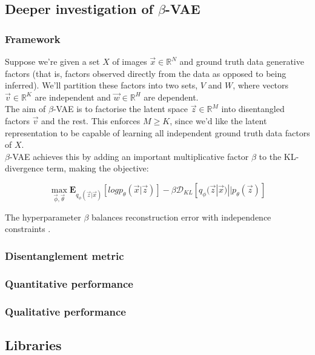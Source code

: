 \documentclass[12pt,twoside]{article}
\begin{document}
\subsection{Deeper investigation of $\beta$-VAE}
\subsubsection{Framework}

Suppose we're given a set $X$ of images $\vec{x}\in\mathbb{R}^N$ and ground truth data generative factors (that is, factors observed directly from the data as opposed to being inferred). We'll partition these factors into two sets, $V$ and $W$, where vectors $\vec{v}\in\mathbb{R}^K$ are independent and $\vec{w}\in\mathbb{R}^H$ are dependent.\\

The aim of $\beta$-VAE is to factorise the latent space $\vec{z}\in\mathbb{R}^M$ into disentangled factors $\vec{v}$ and the rest. This enforces $M\geq K$, since we'd like the latent representation to be capable of learning all independent ground truth data factors of $X$.\\

$\beta$-VAE achieves this by adding an important multiplicative factor $\beta$ to the KL-divergence term, making the objective:

\begin{equation}
\label{beta_vae_objective}
\max_{\vec{\phi},\vec{\theta}}\mathbf{E}_{q_{\phi}(\vec{z}|\vec{x})}[log p_{\theta}(\vec{x}|\vec{z})] - \beta\mathcal{D}_{KL}[q_{\phi}(\vec{z}|\vec{x})||p_{\theta}(\vec{z})]
\end{equation}

The hyperparameter $\beta$ balances reconstruction error with independence constraints \cite{Higgins2016}.

\subsubsection{Disentanglement metric}
\subsubsection{Quantitative performance}
\subsubsection{Qualitative performance}

\subsection{Libraries}
\end{document}
